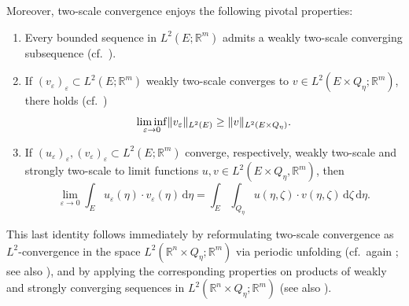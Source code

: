 \documentclass[reqno,11pt]{amsart}
\numberwithin{equation}{section}
\theoremstyle{thmlemcorr}
\numberwithin{theorem}{section}
\theoremstyle{thmlemcorr*}
\theoremstyle{defi}
\theoremstyle{remexample}
\theoremstyle{ass}
\newcommand{\R}{\mathbb{R}}
\DeclarePairedDelimiter{\norm}{\lVert}{\rVert}
\newcommand{\1}{\mathds{1}}
\newcommand{\veps}{\varepsilon}
\newcommand{\dl}{\,\mathrm{d}}
\newcommand{\sequence}[2]{(#1_#2)_{#2}}
\begin{document}
Moreover, two-scale convergence enjoys the following pivotal properties: 
\begin{enumerate}[label=(P\arabic*)]
    \item\label{P1} Every bounded sequence in \(L^2(E;\R^m)\) admits a weakly two-scale converging subsequence (cf.\ \cite[Theorem~7]{LNW02}). 
    
    \item\label{P2} If \(\sequence{v}{\veps}\subset L^2(E;\R^m)\) weakly two-scale converges to \(v\in L^2(E\times Q_\eta;\R^m)\), there holds (cf.\ \cite[Theorem~10]{LNW02})
\begin{equation}\label{eq:norm_lsc}
    \liminf_{\veps\to 0} \norm{v_\veps}_{L^2(E)}
    \ge \norm{v}_{L^2(E\times Q_\eta)}.
\end{equation}

\item\label{P3} If \(\sequence{u}{\veps},\sequence{v}{\veps}\subset L^2(E;\R^m)\) converge, respectively, weakly two-scale and strongly two-scale to limit functions \(u,v\in L^2(E\times Q_\eta,\R^m)\), then 
\begin{equation}\label{eq:ts_products}
    \lim_{\veps\to 0}\int_{E} u_\veps(\eta) \cdot v_\veps(\eta)\dl \eta
        =\int_{E} \int_{Q_\eta} u(\eta,\zeta)\cdot v(\eta,\zeta)\dl \zeta\dl \eta.
\end{equation}
\end{enumerate}
This last identity follows immediately by reformulating two-scale convergence as  \(L^2\)-convergence in the space \(L^2(\R^n\times Q_\eta;\R^m)\) via periodic unfolding (cf.\ again \cite{Vi06}; see also \cite{CDG02}), and by applying the corresponding properties on products of weakly and strongly converging sequences in \(L^2(\R^n\times Q_\eta;\R^m)\)  (see also \cite[Proposition~2.5 and Proposition~2.9]{Vi06}).
\end{document}
